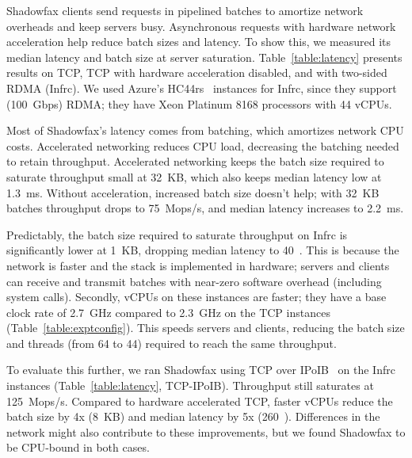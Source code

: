 Shadowfax clients send requests in pipelined batches to amortize
network overheads and keep servers busy.
%
Asynchronous requests with hardware network acceleration
help reduce batch sizes and latency.
%
To show this, we measured its median latency and batch size at
server saturation.
%
%
Table~\ref{table:latency} presents results on TCP, TCP with
hardware acceleration disabled, and with two-sided RDMA (Infrc).
%
We used Azure's HC44rs~\cite{hc44} instances for Infrc, since they support
(100~Gbps) RDMA; they have Xeon Platinum 8168 processors with 44 vCPUs.
%
%
%

Most of Shadowfax's latency comes from batching, which amortizes network CPU
costs. Accelerated networking reduces CPU load, decreasing the batching
needed to retain throughput.
%
%
Accelerated networking keeps the batch size required to saturate
throughput small at 32~KB, which also keeps median latency low at 1.3~ms.
%
%
Without acceleration, increased batch size doesn't help; with 32~KB
batches throughput drops to 75~Mops/s, and median latency increases to 2.2~ms.

Predictably, the batch size required to saturate throughput on Infrc is
significantly lower at 1~KB, dropping median latency to 40~\us.
%
This is because the network is faster and the stack is implemented in hardware;
servers and clients can receive and transmit batches with near-zero
software overhead (including system calls).
%
Secondly, vCPUs on these instances are faster; they have a base clock rate of
2.7~GHz compared to 2.3~GHz on the TCP instances
(Table~\ref{table:exptconfig}).
%
This speeds servers and clients, reducing the batch size and
threads (from 64 to 44) required to reach the same throughput.

To evaluate this further, we ran Shadowfax using TCP over IPoIB~\cite{ipoib} on
the Infrc instances (Table~\ref{table:latency}, TCP-IPoIB).
%
Throughput still saturates at 125~Mops/s.
%
Compared to hardware accelerated TCP, faster vCPUs reduce the batch size
by 4x (8~KB) and median latency by 5x (260~\us).
%
Differences in the network might also contribute to these improvements,
but we found Shadowfax to be CPU-bound in both cases.

